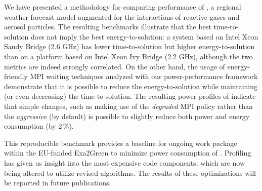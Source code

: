 We  have   presented  a  methodology  for   comparing  performance  of
\cosmoart,  a  regional  weather  forecast  model  augmented  for  the
interactions of  reactive gases and aerosol  particles.  The resulting
benchmarks illustrate  that the  best time-to-solution does  not imply
the best energy-to-solution: a system based on Intel Xeon Sandy Bridge (2.6 GHz) has
lower time-to-solution but higher energy-to-solution than on a platform based on Intel Xeon Ivy
Bridge (2.2 GHz), although  the two metrics are indeed strongly
correlated.   On the  other  hand, the  usage  of energy-friendly  MPI
waiting techniques analyzed  with our power-per\-for\-man\-ce framework demonstrate
that   it  is   possible  to   reduce the energy-to-solution   while  maintaining   (or  even   decreasing)  the
time-to-so\-lu\-tion. The resulting power profiles of \cosmoart indicate that simple changes,
such as making use of the  \emph{degraded} MPI policy rather than the \emph{aggressive} (by default) is  possible to  slightly  reduce both  power and  energy consumption (by 2\,\%).

This  reproducible  benchmark provides  a  baseline  for ongoing  work
package within  the EU-funded Exa2Green to  minimize power consumption
of \cosmoart. Profiling  has given us insight into  the most expensive
code  components,  which are  now  being  altered  to utilize  revised
algorithms.  The  results of these  optimizations will be  reported in
future publications.
